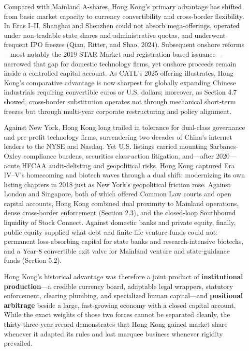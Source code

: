 \documentclass[11pt,letterpaper]{article}
\begin{document}
Compared with Mainland A-shares, Hong Kong's primary advantage has shifted from basic market capacity to currency convertibility and cross-border flexibility. In Eras I–II, Shanghai and Shenzhen could not absorb mega-offerings, operated under non-tradable state shares and administrative quotas, and underwent frequent IPO freezes (Qian, Ritter, and Shao, 2024). Subsequent onshore reforms—most notably the 2019 STAR Market and registration-based issuance—narrowed that gap for domestic technology firms, yet onshore proceeds remain inside a controlled capital account. As CATL's 2025 offering illustrates, Hong Kong's comparative advantage is now sharpest for globally expanding Chinese industrials requiring convertible euros or U.S. dollars; moreover, as Section 4.7 showed, cross-border substitution operates not through mechanical short-term freezes but through multi-year corporate restructuring and policy alignment.

Against New York, Hong Kong long trailed in tolerance for dual-class governance and pre-profit technology firms, surrendering two decades of China's internet leaders to the NYSE and Nasdaq. Yet U.S. listings carried mounting Sarbanes-Oxley compliance burdens, securities class-action litigation, and—after 2020—acute HFCAA audit-delisting and geopolitical risks. Hong Kong captured Era IV–V's homecoming and biotech waves through a dual shift: modernizing its own listing chapters in 2018 just as New York's geopolitical friction rose. Against London and Singapore, both of which offered Common Law courts and open capital accounts, Hong Kong combined dual proximity to Mainland operations, dense cross-border enforcement (Section 2.3), and the closed-loop Southbound liquidity of Stock Connect. Against domestic banks and private equity, finally, public equity supplied what debt and finite-life venture funds could not: permanent loss-absorbing capital for state banks and research-intensive biotechs, and a Year-8 convertible exit valve for Mainland venture and state-guidance funds (Section 5.2).

Hong Kong's historical advantage was therefore a joint product of \textbf{institutional production}—a credible currency board, adaptable legal wrappers, statutory enforcement, clearing plumbing, and specialized human capital—and \textbf{positional arbitrage} beside a large, fast-growing economy with a closed capital account. While the exact weights of those two forces cannot be separated cleanly, the thirty-three-year record demonstrates that Hong Kong gained market share whenever it adapted its rules and lost marquee business whenever rigidity prevailed.
\end{document}
